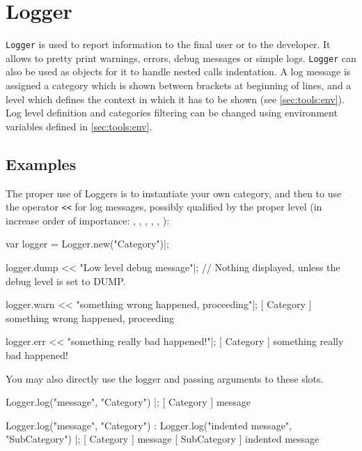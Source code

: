
\section{Logger}

\lstinline|Logger| is used to report information to the final user or to the
developer. It allows to pretty print warnings, errors, debug messages or
simple logs. \lstinline|Logger| can also be used as  objects
for it to handle nested calls indentation. A log message is assigned a
category which is shown between brackets at beginning of lines, and a level
which defines the context in which it has to be shown (see
\autoref{sec:tools:env}). Log level definition and categories filtering can
be changed using environment variables defined in \autoref{sec:tools:env}.

\subsection{Examples}

The proper use of Loggers is to instantiate your own category, and then to
use the operator \lstinline|<<| for log messages, possibly qualified by the
proper level (in increase order of importance: ,
, , , ,
):

\begin{urbiscript}
var logger = Logger.new("Category")|;

logger.dump << "Low level debug message"|;
// Nothing displayed, unless the debug level is set to DUMP.

logger.warn << "something wrong happened, proceeding"|;
[       Category        ] something wrong happened, proceeding

logger.err << "something really bad happened!"|;
[       Category        ] something really bad happened!
\end{urbiscript}

You may also directly use the logger and passing arguments to these slots.

\begin{urbiscript}
Logger.log("message", "Category") |;
[       Category        ] message

Logger.log("message", "Category") :
{
  Logger.log("indented message", "SubCategory")
}|;
[       Category        ] message
[      SubCategory      ]   indented message
\end{urbiscript}

